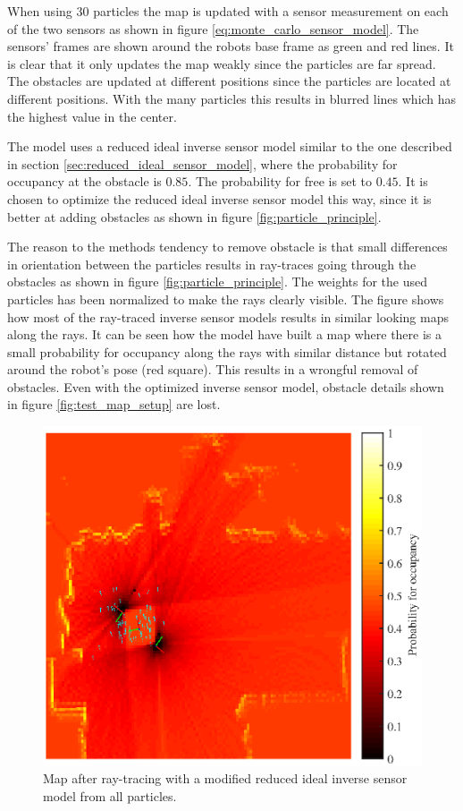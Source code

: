 When using $30$ particles the map is updated with a sensor measurement on each of the two sensors as shown in figure \vref{eq:monte_carlo_sensor_model}.
The sensors' frames are shown around the robots base frame as green and red lines.
It is clear that it only updates the map weakly since the particles are far spread. 
The obstacles are updated at different positions since the particles are located at different positions. With the many particles this results in blurred lines which has the highest value in the center.

The model uses a reduced ideal inverse sensor model similar to the one described in section \vref{sec:reduced_ideal_sensor_model}, where the probability for occupancy at the obstacle is $0.85$. The probability for free is set to $0.45$. 
It is chosen to optimize the reduced ideal inverse sensor model this way, since it is better at adding obstacles as shown in figure \vref{fig:particle_principle}.

The reason to the methods tendency to remove obstacle is that small differences in orientation between the particles results in ray-traces going through the obstacles as shown in figure \vref{fig:particle_principle}. The weights for the used particles has been normalized to make the rays clearly visible. 
The figure shows how most of the ray-traced inverse sensor models results in similar looking maps along the rays. 
It can be seen how the model have built a map where there is a small probability for occupancy along the rays with similar distance but rotated around the robot's pose (red square). This results in a wrongful removal of obstacles.
Even with the optimized inverse sensor model, obstacle details shown in figure \ref{fig:test_map_setup} are lost. 

\begin{figure}[htbp]
	\centering
	\includegraphics[scale=1.0]{figures/static_mapping/particle_principle}
	\caption{Map after ray-tracing with a modified reduced ideal inverse sensor model from all particles.}
	\label{fig:particle_principle}
\end{figure}

